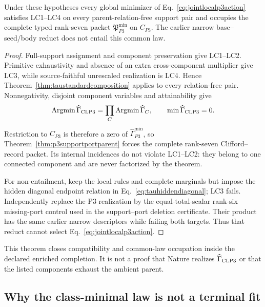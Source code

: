 \begin{theorem}
\label{thm:jointlocalp3}
Under these hypotheses every global minimizer of
Eq.~\eqref{eq:jointlocalp3action} satisfies LC1--LC4 on every
parent-relation-free support pair and occupies the complete typed rank-seven
packet $\mathfrak P_{P3}^{\min}$ on $C_{P3}$.  The earlier narrow
base--seed/body reduct does not entail this common law.
\end{theorem}

\begin{proof}
Full-support assignment and component preservation give LC1--LC2.  Primitive
exhaustivity and absence of an extra cross-component multiplier give LC3,
while source-faithful unrescaled realization is LC4.  Hence
Theorem~\ref{thm:taustandardcomposition} applies to every relation-free pair.
Nonnegativity, disjoint component variables and attainability give
\begin{equation}
 \operatorname*{Argmin}\widehat\Gamma_{\rm CLP3}
 =\prod_C\operatorname*{Argmin}\widehat\Gamma_C,
 \qquad \min\widehat\Gamma_{\rm CLP3}=0.
 \label{eq:jointlocalp3argmin}
\end{equation}
Restriction to $C_{P3}$ is therefore a zero of
$\widehat\Gamma_{P3}^{\min}$, so
Theorem~\ref{thm:p3supportportparent} forces the complete rank-seven
Clifford--record packet.  Its internal incidences do not violate LC1--LC2:
they belong to one connected component and are never factorized by the
theorem.

For non-entailment, keep the local rules and complete marginals but impose the
hidden diagonal endpoint relation in Eq.~\eqref{eq:tauhiddendiagonal}; LC3
fails.  Independently replace the P3 realization by the equal-total-scalar
rank-six missing-port control used in the support--port deletion certificate.
Their product has the same earlier narrow descriptors while failing both
targets.  Thus that reduct cannot select
Eq.~\eqref{eq:jointlocalp3action}.
\end{proof}

This theorem closes compatibility and common-law occupation inside the
declared enriched completion.  It is not a proof that Nature realizes
$\widehat\Gamma_{\rm CLP3}$ or that the listed components exhaust the ambient
parent.

\subsection{Why the class-minimal law is not a terminal fit}

